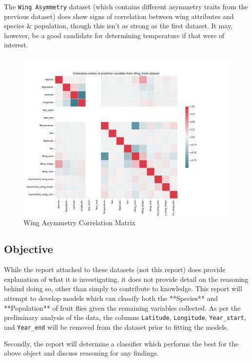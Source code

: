 \documentclass{article}
\begin{document}
The \texttt{Wing Asymmetry} dataset (which contains different asymmetry traits from the previous dataset) does show signs of correlation between wing attributes and species & population, though this isn't as strong as the first dataset. It may, however, be a good candidate for determining temperature if that were of interest.

\begin{figure}
    \centering
    \includegraphics{plots/Wing_traits_corr_matrix.png}
    \caption{Wing Asymmetry Correlation Matrix}
    \label{fig:wing_asymmetry_corr_matrix}
\end{figure}

\subsection{Objective}

While the report attached to these datasets (not this report) does provide explanation of what it is investigating, it does not provide detail on the reasoning behind doing so, other than simply to contribute to knowledge. This report will attempt to develop models which can classify both the **Species** and **Population** of fruit flies given the remaining variables collected. As per the preliminary analysis of the data, the columns \texttt{Latitude}, \texttt{Longitude}, \texttt{Year_start}, and \texttt{Year_end} will be removed from the dataset prior to fitting the models.

Secondly, the report will determine a classifier which performs the best for the above object and discuss reasoning for any findings.
\end{document}
